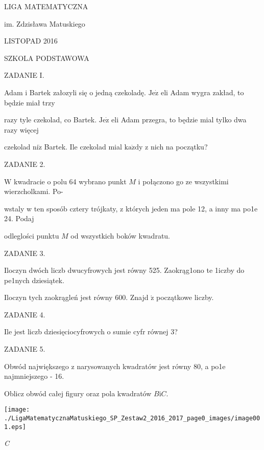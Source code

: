 \documentclass[a4paper,12pt]{article}
\begin{document}
LIGA MATEMATYCZNA

im. Zdzisława Matuskiego

LISTOPAD 2016

SZKOLA PODSTAWOWA

ZADANIE I.

Adam i Bartek załozyli się o jedną czekoladę. $\mathrm{J}\mathrm{e}\dot{\mathrm{z}}$ eli Adam wygra zakład, to będzie miał trzy

razy tyle czekolad, co Bartek. $\mathrm{J}\mathrm{e}\dot{\mathrm{z}}$ eli Adam przegra, to będzie mial tylko dwa razy więcej

czekolad $\mathrm{n}\mathrm{i}\dot{\mathrm{z}}$ Bartek. Ile czekolad mial $\mathrm{k}\mathrm{a}\dot{\mathrm{z}}\mathrm{d}\mathrm{y}$ z nich na początku?

ZADANIE 2.

$\mathrm{W}$ kwadracie o polu 64 wybrano punkt $M$ i połączono go ze wszystkimi wierzcholkami. Po-

wstaly w ten sposób cztery trójkaty, z których jeden ma pole 12, a inny ma po1e 24. Podaj

odleglości punktu $M$ od wszystkich boków kwadratu.

ZADANIE 3.

Iloczyn dwóch liczb dwucyfrowych jest równy 525. Zaokrąg1ono te 1iczby do pe1nych dziesiątek.

Iloczyn tych zaokrągleń jest równy 600. Znajd $\acute{\mathrm{z}}$ początkowe liczby.

ZADANIE 4.

Ile jest liczb dziesięciocyfrowych o sumie cyfr równej 3?

ZADANIE 5.

Obwód największego z narysowanych kwadratów jest równy 80, a po1e najmniejszego - 16.

Oblicz obwód całej figury oraz pola kwadratów $B\mathrm{i}C.$
\begin{center}
\texttt{[image: ./LigaMatematycznaMatuskiego\_SP\_Zestaw2\_2016\_2017\_page0\_images/image001.eps]}
\end{center}
{\it C}
\end{document}
